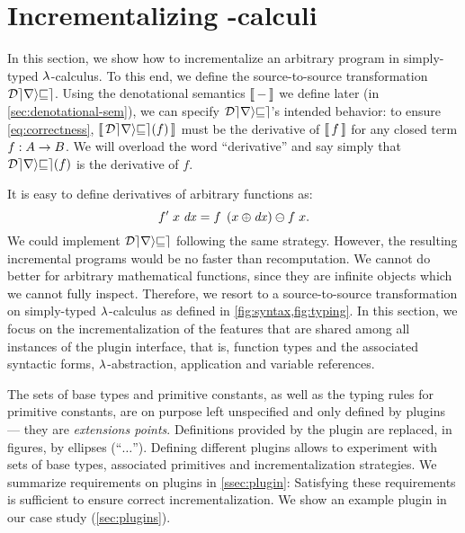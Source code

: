 


\section{Incrementalizing \TitleLambda{}-calculi}
\label{sec:differentiate}
\label{sec:correctness}



In this section, we show how to incrementalize an arbitrary
program in simply-typed $\lambda$-calculus. To this end, we define
the source-to-source transformation $\mathcal{Derive}$. Using the
denotational semantics $\Eval{-}$ we define later (in
\cref{sec:denotational-sem}), we can specify $\mathcal{Derive}$'s intended
behavior: to ensure \cref{eq:correctness},
$\Eval{\Derive{f}}$ must be the derivative of $\Eval{f}$
for any closed term $\HasType{f}{A \to B}$. We will overload the word
``derivative'' and say simply that $\Derive{f}$ is the derivative of
$f$.

It is easy to define derivatives of arbitrary functions as:
\[\App{\App{f'}{x}}{\D x} = \Diff{\App{f}{\Update*{x}{\D x}}}{\App f x}\text{.}\]
We could implement $\mathcal{Derive}$ following the same strategy.
However, the resulting incremental programs would be no faster
than recomputation. We cannot do better for arbitrary mathematical functions,
since they are infinite objects which we cannot fully inspect.
%
%
Therefore, we resort to a source-to-source transformation
on simply-typed $\lambda$-calculus as defined in 
\cref{fig:syntax,fig:typing}. In this section, we focus on the
incrementalization of the features that are shared among all
instances of the plugin interface, that is, function types and the
associated syntactic forms, $\lambda$-abstraction, application and
variable references.

The sets of base types and primitive
constants, as well as the typing rules for primitive constants, are
on purpose left unspecified and only defined by plugins --- they are \emph{extensions points}.
Definitions provided by the plugin are replaced, in figures, by ellipses
(``$\ldots$'').
Defining different plugins allows to experiment with
sets of base types, associated primitives and incrementalization strategies.
We summarize requirements on plugins in \cref{ssec:plugin}:
Satisfying these requirements is sufficient to ensure
correct incrementalization.
We show an example plugin in our case study
(\cref{sec:plugins}).

